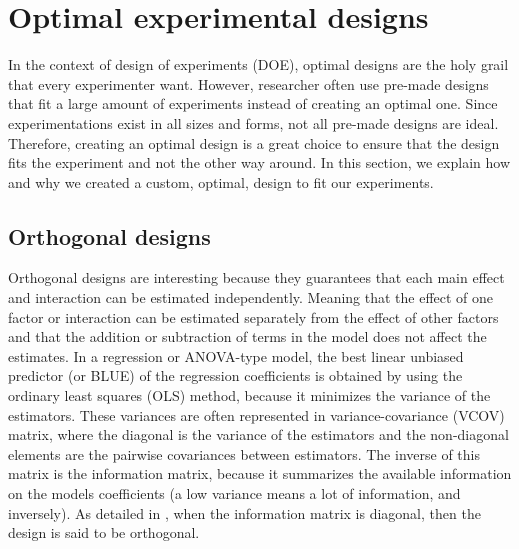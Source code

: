 
\section{Optimal experimental designs}
In the context of design of experiments (DOE), optimal designs are the holy grail that every experimenter want. However, researcher often use pre-made designs that fit a large amount of experiments instead of creating an optimal one. Since experimentations exist in all sizes and forms, not all pre-made designs are ideal. Therefore, creating an optimal design is a great choice to ensure that the design fits the experiment and not the other way around. In this section, we explain how and why we created a custom, optimal, design to fit our experiments.

\subsection{Orthogonal designs}
Orthogonal designs are interesting because they guarantees that each main effect and interaction can 
be estimated independently. Meaning that the effect of one factor or interaction can be estimated separately from the effect of 
other factors
and that the addition or subtraction of terms in the model does not affect the estimates.
In a regression or ANOVA-type model, the best linear unbiased predictor (or BLUE) of the regression coefficients is obtained by 
using 
the ordinary least squares (OLS) method, because it minimizes the variance of the estimators. 
These variances are often represented in variance-covariance (VCOV) matrix, 
where the diagonal is the variance of the estimators and the non-diagonal elements are the pairwise covariances between 
estimators. 
The inverse of this matrix is the information matrix, 
because it summarizes the available information  on the models coefficients (a low variance means a lot of information, and 
inversely).
As detailed in \textcite{goos_optimal_2011}, when the information matrix is diagonal, then the design is said to be orthogonal.

